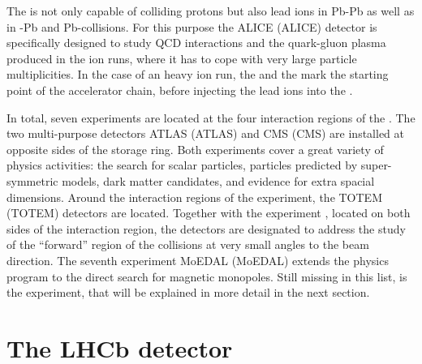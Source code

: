 The \LHC is not only capable of colliding protons but also lead ions in Pb-Pb as
well as in \proton-Pb and Pb-\proton collisions. For this purpose the
\acs{ALICE} (\acl{ALICE}) detector \cite{Aamodt:2008zz} is specifically designed
to study QCD interactions and the quark-gluon plasma produced in the \LHC ion
runs, where it has to cope with very large particle multiplicities. In the case
of an heavy ion run, the
\LINACThree and the \LEIR mark the starting point of the accelerator chain,
before injecting the lead ions into the \PSyn.

In total, seven experiments are located at the four interaction regions of the
\LHC. The two multi-purpose detectors \acs{ATLAS} (\acl{ATLAS})
\cite{Aad:2008zzm} and \acs{CMS} (\acl{CMS}) \cite{Chatrchyan:2008aa} are
installed at opposite sides of the storage ring. Both experiments cover a great
variety of physics activities: the search for scalar particles, particles
predicted by super-symmetric models, dark matter candidates, and evidence for
extra spacial dimensions. Around the interaction regions of the \CMS experiment,
the \acs{TOTEM} (\acl{TOTEM}) detectors \cite{Anelli:2008zza} are located.
Together with the \LHCf experiment \cite{Adriani:2008zz}, located on both sides
of the \ATLAS interaction region, the detectors are designated to address the
study of the \enquote{forward} region of the collisions at very small angles to
the beam direction. The seventh experiment \acs{MoEDAL} (\acl{MoEDAL}) extends
the \LHC physics program to the direct search for magnetic monopoles. Still
missing in this list, is the \LHCb experiment, that will be explained in more
detail in the next section.


\section{The LHCb detector}
\label{sec:lhcb_experiment:detector}

